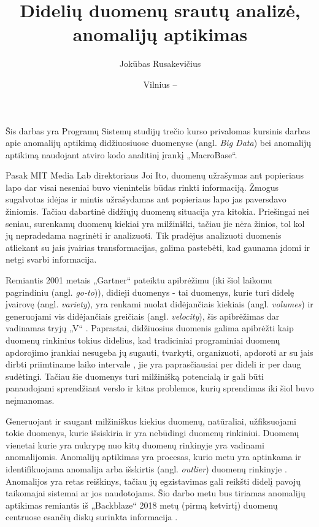 \documentclass{VUMIFPSkursinis}
\title{Didelių duomenų srautų analizė, anomalijų aptikimas}
\author{Jokūbas Rusakevičius}
\date{Vilnius – \the\year}
\begin{document}
\maketitle

\tableofcontents

Šis darbas yra Programų Sistemų studijų trečio kurso privalomas kursinis darbas apie anomalijų aptikimą didžiuosiuose duomenyse (angl. \textit{Big Data}) bei anomalijų aptikimą naudojant atviro kodo analitinį įrankį „MacroBase“.

Pasak MIT Media Lab direktoriaus Joi Ito, duomenų užrašymas ant popieriaus lapo dar visai neseniai buvo vienintelis būdas rinkti informaciją. Žmogus sugalvotas idėjas ir mintis užrašydamas ant popieriaus lapo jas paversdavo žiniomis. Tačiau dabartinė didžiųjų duomenų situacija yra kitokia. Priešingai nei seniau, surenkamų duomenų kiekiai yra milžiniški, tačiau jie nėra žinios, tol kol jų nepradedama nagrinėti ir analizuoti. Tik pradėjus analizuoti duomenis atliekant su jais įvairias transformacijas, galima pastebėti, kad gaunama įdomi ir netgi svarbi informacija\cite{documentary}. \par

Remiantis 2001 metais „Gartner“ pateiktu apibrėžimu (iki šiol laikomu pagrindiniu (angl. \textit{go-to})), didieji duomenys - tai duomenys, kurie turi didelę įvairovę (angl. \textit{variety}), yra renkami nuolat didėjančiais kiekiais (angl. \textit{volumes}) ir generuojami vis didėjančiais greičiais (angl. \textit{velocity}), šis apibrėžimas dar vadinamas tryjų „V“ \cite{three_vs}. Paprastai, didžiuosius duomenis galima apibrėžti kaip duomenų rinkinius tokius didelius, kad tradiciniai programiniai duomenų apdorojimo įrankiai nesugeba jų sugauti, tvarkyti, organizuoti, apdoroti ar su jais dirbti priimtiname laiko intervale \cite{bigdata_tolerable_time}, jie yra paprasčiausiai per dideli ir per daug sudėtingi. Tačiau šie duomenys turi milžinišką potencialą ir gali būti panaudojami sprendžiant verslo ir kitas problemos, kurių sprendimas iki šiol buvo neįmanomas.\par

Generuojant ir saugant milžiniškus kiekius duomenų, natūraliai, užfiksuojami tokie duomenys, kurie išsiskiria ir yra nebūdingi duomenų rinkiniui. Duomenų vienetai kurie yra nukrypę nuo kitų duomenų rinkinyje yra vadinami anomalijomis. Anomalijų aptikimas yra procesas, kurio metu yra aptinkama ir identifikuojama anomalija arba išskirtis (angl. \textit{outlier}) duomenų rinkinyje \cite{anomaly}. Anomalijos yra retas reiškinys, tačiau jų egzistavimas gali reikšti didelį pavojų taikomajai sistemai ar jos naudotojams. Šio darbo metu bus tiriamas anomalijų aptikimas remiantis iš „Backblaze“ 2018 metų (pirmą ketvirtį) duomenų centruose esančių diskų surinkta informacija \cite{backblaze}.\par
\end{document}
